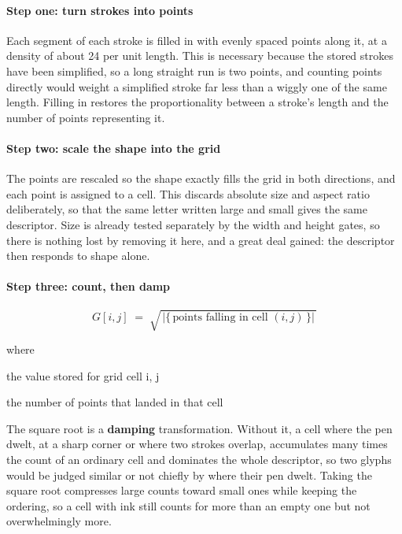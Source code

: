 \paragraph{Step one: turn strokes into points}
Each segment of each stroke is filled in with evenly spaced points along it, at a density of about 24 per unit length. This is necessary because the stored strokes have been simplified, so a long straight run is two points, and counting points directly would weight a simplified stroke far less than a wiggly one of the same length. Filling in restores the proportionality between a stroke's length and the number of points representing it.


\paragraph{Step two: scale the shape into the grid}
The points are rescaled so the shape exactly fills the grid in both directions, and each point is assigned to a cell. This discards absolute size and aspect ratio deliberately, so that the same letter written large and small gives the same descriptor. Size is already tested separately by the width and height gates, so there is nothing lost by removing it here, and a great deal gained: the descriptor then responds to shape alone.


\paragraph{Step three: count, then damp}

\begin{equation}
G[i,j] \;=\; \sqrt{\,\big|\{\,\text{points falling in cell } (i,j)\,\}\big|\,}
\end{equation}

\noindent where
\begin{description}[leftmargin=2.4em,style=nextline,font=\normalfont\ttfamily]\setlength\itemsep{1pt}
  \item[{$G[i,j]$}] \normalfont the value stored for grid cell i, j
  \item[{$|\{\cdot\}|$}] \normalfont the number of points that landed in that cell
\end{description}
The square root is a \textbf{damping} transformation. Without it, a cell where the pen dwelt, at a sharp corner or where two strokes overlap, accumulates many times the count of an ordinary cell and dominates the whole descriptor, so two glyphs would be judged similar or not chiefly by where their pen dwelt. Taking the square root compresses large counts toward small ones while keeping the ordering, so a cell with ink still counts for more than an empty one but not overwhelmingly more.


